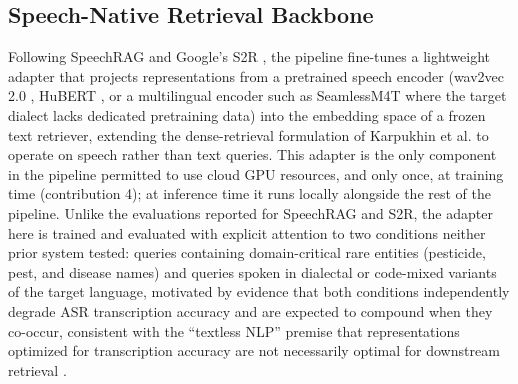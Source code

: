 \documentclass[conference]{IEEEtran}
\begin{document}
\subsection{Speech-Native Retrieval Backbone}
Following SpeechRAG \cite{min2025speechrag} and Google's S2R \cite{google2025s2r}, the pipeline fine-tunes a lightweight adapter that projects representations from a pretrained speech encoder (wav2vec 2.0 \cite{baevski2020wav2vec}, HuBERT \cite{hsu2021hubert}, or a multilingual encoder such as SeamlessM4T \cite{barrault2023seamlessm4t} where the target dialect lacks dedicated pretraining data) into the embedding space of a frozen text retriever, extending the dense-retrieval formulation of Karpukhin et al. \cite{karpukhin2020dpr} to operate on speech rather than text queries. This adapter is the only component in the pipeline permitted to use cloud GPU resources, and only once, at training time (contribution 4); at inference time it runs locally alongside the rest of the pipeline. Unlike the evaluations reported for SpeechRAG and S2R, the adapter here is trained and evaluated with explicit attention to two conditions neither prior system tested: queries containing domain-critical rare entities (pesticide, pest, and disease names) and queries spoken in dialectal or code-mixed variants of the target language, motivated by evidence that both conditions independently degrade ASR transcription accuracy \cite{benchmarkingasr2026,dialectmatters2026} and are expected to compound when they co-occur, consistent with the ``textless NLP'' premise that representations optimized for transcription accuracy are not necessarily optimal for downstream retrieval \cite{spidr2025}.
\end{document}
